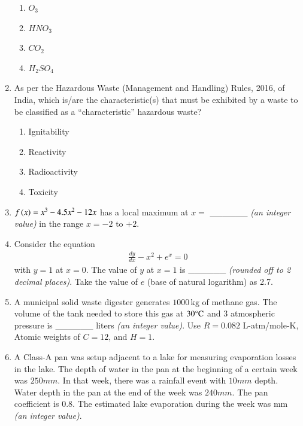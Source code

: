 \documentclass[journal]{IEEEtran}
\begin{document}
\begin{enumerate}
\begin{multicols}{2}
\begin{enumerate}
\item $O_3$
\item $HNO_3$
\item $CO_2$
\item $H_2SO_4$
\end{enumerate}
\end{multicols}

\item As per the Hazardous Waste (Management and Handling) Rules, 2016, of India, which is/are the characteristic(s) that must be exhibited by a waste to be classified as a ``characteristic'' hazardous waste? \hfill{}

\begin{multicols}{2}
\begin{enumerate}
\item Ignitability
\item Reactivity
\item Radioactivity
\item Toxicity
\end{enumerate}
\end{multicols}

\item $f\left(x\right) = x^3 - 4.5x^2 - 12x$ has a local maximum at $x =$ \_\_\_\_\_\_ \textit{(an integer value)} in the range $x = -2$ to $+2$. \hfill{}

\item Consider the equation
\begin{align*}
\frac{dy}{dx} - x^2 + e^x = 0
\end{align*}
with $y = 1$ at $x = 0$. The value of $y$ at $x = 1$ is \_\_\_\_\_\_ \textit{(rounded off to 2 decimal places)}. Take the value of $e$ (base of natural logarithm) as 2.7. \hfill{}

\item A municipal solid waste digester generates $1000\,\text{kg}$ of methane gas. The volume of the tank needed to store this gas at $30\celsius$ and $3$ atmospheric pressure is \_\_\_\_\_\_ liters \textit{(an integer value)}. Use $R = 0.082$ L-atm/mole-K, Atomic weights of $C=12$, and $H=1$. \hfill{}

\item A Class-A pan was setup adjacent to a lake for measuring evaporation losses in the lake. The depth of water in the pan at the beginning of a certain week was $250mm$. In that week, there was a rainfall event with $10mm$ depth. Water depth in the pan at the end of the week was $240mm$. The pan coefficient is $0.8$. The estimated lake evaporation during the week was \underline{\phantom{answer}} mm \textit{(an integer value)}. \hfill{}


\end{enumerate}
\end{document}
